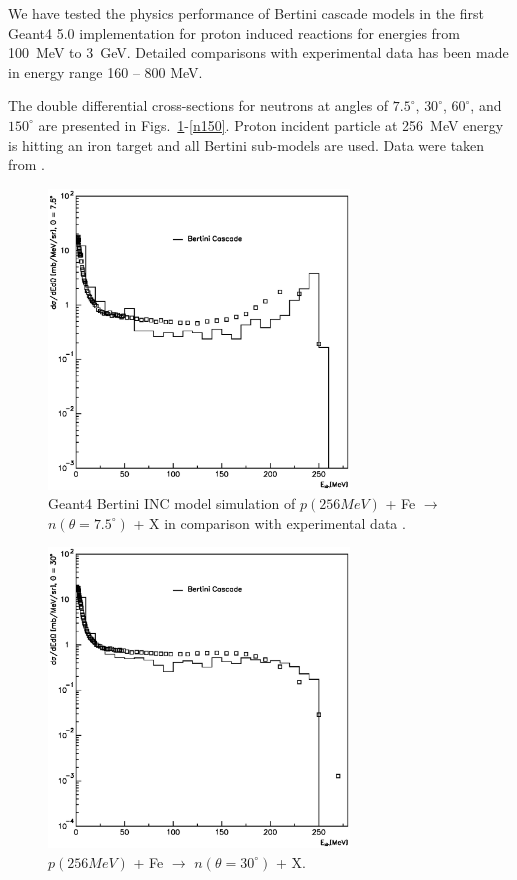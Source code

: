\documentclass[twocolumn,twoside,slac,floatfix]{revtex4}
\begin{document}
We have tested the physics performance of Bertini cascade models in the first Geant4 5.0 implementation for proton induced reactions for energies from 100~MeV to 3~GeV. 
Detailed comparisons with experimental data has been made in energy range 160 -- 800 MeV.
 

The double differential cross-sections for neutrons at angles of $7.5^{\circ}$, $30^{\circ}$, $60^{\circ}$, and $150^{\circ}$  are presented in Figs.~\ref{n7}-\ref{n150}. Proton incident particle at 256~MeV energy is hitting an iron target and all Bertini sub-models are used.
Data were taken from \cite{256iron}.



\begin{figure}
  \includegraphics[width=80mm, keepaspectratio]{pn_fe_256_n_a0.eps}
  \caption{Geant4 Bertini INC model simulation of $p(256 MeV)$ + Fe $\rightarrow$ $n(\theta = 7.5^{\circ})$ + X in comparison with experimental data \cite{256iron}.}
  \label{n7}
\end{figure}

\begin{figure}
  \includegraphics[width=80mm,keepaspectratio]{pn_fe_256_n_a1.eps}
  \caption{$p(256 MeV)$ + Fe $\rightarrow$ $n(\theta = 30^{\circ})$ + X.}
  \label{n30}
\end{figure}
\end{document}

